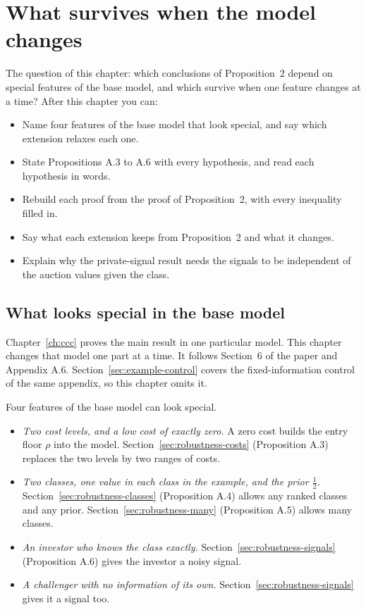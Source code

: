 \chapter{What survives when the model changes}\label{ch:robustness}

\begin{chapterplan}
The question of this chapter: which conclusions of Proposition~2 depend on special features of the base model, and which survive when one feature changes at a time?
After this chapter you can:
\begin{itemize}
\item Name four features of the base model that look special, and say which extension relaxes each one.
\item State Propositions A.3 to A.6 with every hypothesis, and read each hypothesis in words.
\item Rebuild each proof from the proof of Proposition~2, with every inequality filled in.
\item Say what each extension keeps from Proposition~2 and what it changes.
\item Explain why the private-signal result needs the signals to be independent of the auction values given the class.
\end{itemize}
\end{chapterplan}

\section{What looks special in the base model}\label{sec:robustness-words}

Chapter~\ref{ch:ccc} proves the main result in one particular model.
This chapter changes that model one part at a time.
It follows Section~6 of the paper and Appendix A.6.
Section~\ref{sec:example-control} covers the fixed-information control of the same appendix, so this chapter omits it.

Four features of the base model can look special.
\begin{itemize}
\item \emph{Two cost levels, and a low cost of exactly zero.} A zero cost builds the entry floor \(\rho\) into the model. Section~\ref{sec:robustness-costs} (Proposition A.3) replaces the two levels by two ranges of costs.
\item \emph{Two classes, one value in each class in the example, and the prior \(\tfrac12\).} Section~\ref{sec:robustness-classes} (Proposition A.4) allows any ranked classes and any prior. Section~\ref{sec:robustness-many} (Proposition A.5) allows many classes.
\item \emph{An investor who knows the class exactly.} Section~\ref{sec:robustness-signals} (Proposition A.6) gives the investor a noisy signal.
\item \emph{A challenger with no information of its own.} Section~\ref{sec:robustness-signals} gives it a signal too.
\end{itemize}

